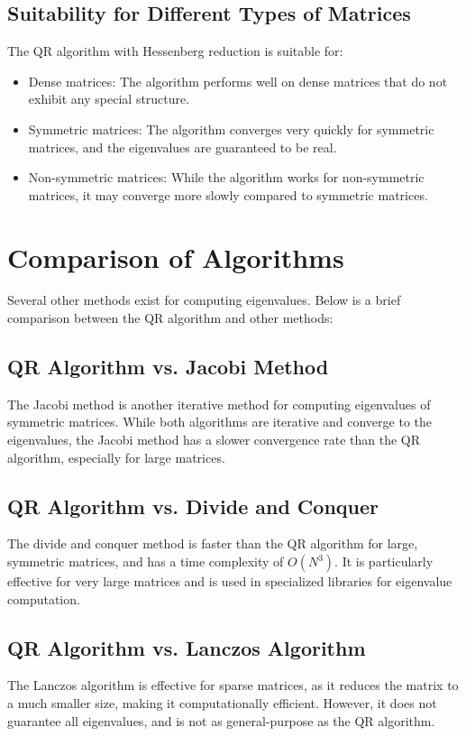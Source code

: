 \documentclass[12pt,a4paper]{article}
\begin{document}
\subsection{Suitability for Different Types of Matrices}
The QR algorithm with Hessenberg reduction is suitable for:
\begin{itemize}
    \item Dense matrices: The algorithm performs well on dense matrices that do not exhibit any special structure.
    \item Symmetric matrices: The algorithm converges very quickly for symmetric matrices, and the eigenvalues are guaranteed to be real.
    \item Non-symmetric matrices: While the algorithm works for non-symmetric matrices, it may converge more slowly compared to symmetric matrices.
\end{itemize}

\section{Comparison of Algorithms}
Several other methods exist for computing eigenvalues. Below is a brief comparison between the QR algorithm and other methods:

\subsection{QR Algorithm vs. Jacobi Method}
The Jacobi method is another iterative method for computing eigenvalues of symmetric matrices. While both algorithms are iterative and converge to the eigenvalues, the Jacobi method has a slower convergence rate than the QR algorithm, especially for large matrices.

\subsection{QR Algorithm vs. Divide and Conquer}
The divide and conquer method is faster than the QR algorithm for large, symmetric matrices, and has a time complexity of \( O(N^3) \). It is particularly effective for very large matrices and is used in specialized libraries for eigenvalue computation.

\subsection{QR Algorithm vs. Lanczos Algorithm}
The Lanczos algorithm is effective for sparse matrices, as it reduces the matrix to a much smaller size, making it computationally efficient. However, it does not guarantee all eigenvalues, and is not as general-purpose as the QR algorithm.
\end{document}
